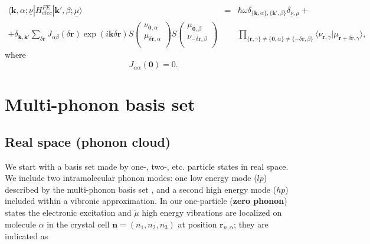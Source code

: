 \documentclass[pt12]{article}
\newcommand{\bfk}{\mathbf{k}}
\newcommand{\bfr}{\mathbf{r}}
\newcommand{\bfn}{\mathbf{n}}
\newcommand{\tmu}{\tilde{\mu}}
\begin{document}
\begin{eqnarray}\label{Matrix_elements_elec_nm}
\langle \bfk,\alpha ; \underline{\nu} | H^{FE}_{elec} | \bfk',\beta ;
\underline{\mu} \rangle &=& \hbar \omega
\delta_{\{\bfk,\alpha\},\{\bfk',\beta\}} \delta_{\underline{\nu},
\underline{\mu}} + \\
\nonumber
 + \delta_{\bfk,\bfk'} \sum_{\delta\bfr}
J_{\alpha\beta}(\delta\bfr) \exp(i\bfk\delta\bfr)
 S\left(
                                  \begin{array}{c}
                                    \nu_{\textbf{0},\alpha} \\
                                    \mu_{\delta\bfr,\alpha} \\
                                  \end{array}
                                \right)
 S\left(
                                \begin{array}{c}
                                    \mu_{\textbf{0},\beta} \\
                                    \nu_{-\delta\bfr,\beta} \\
                                  \end{array}
                                \right)
& & \prod_{\{\bfr,\gamma\} \neq \{\textbf{0},\alpha\} \neq
\{-\delta\bfr,\beta\}} \langle
\nu_{\bfr,\gamma}|\mu_{\bfr+\delta\bfr,\gamma} \rangle,
\end{eqnarray}
where
\begin{equation}\label{delta_n_def}
J_{\alpha\alpha}(\textbf{0})=0.
\end{equation}

\section{Multi-phonon basis set}

\subsection{Real space (phonon cloud)}

We start with a basis set made by one-, two-, etc. particle states in real space. We include two intramolecular phonon modes: one low energy mode ($lp$) described by the multi-phonon basis set , and a second high energy mode ($hp$) included within a vibronic approximation. In our one-particle (\textbf{zero phonon}) states the electronic excitation and $\tmu$ high energy vibrations are localized on molecule $\alpha$ in the crystal cell $\bfn=(n_1,n_2,n_3)$ at position $\textbf{r}_{n,\alpha}$; they are
indicated as
\end{document}
